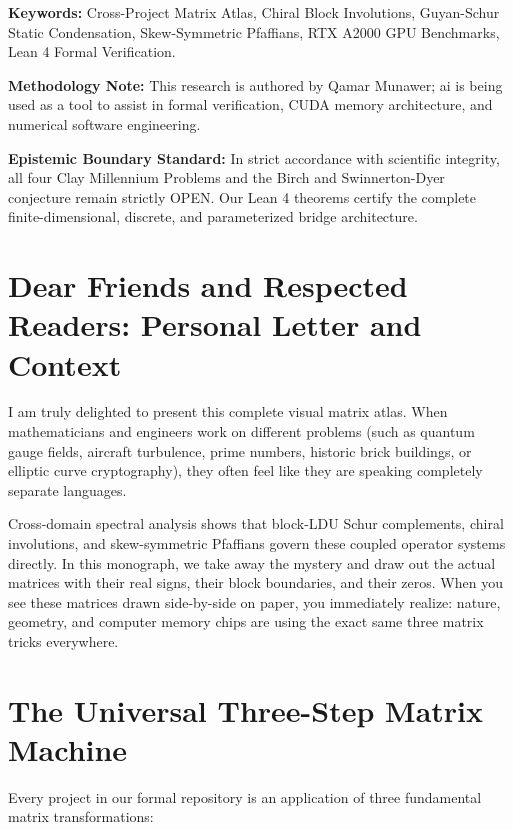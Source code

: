 \documentclass[11pt,a4paper]{article}
\begin{document}
\vspace{0.5em}
\noindent\textbf{Keywords:} Cross-Project Matrix Atlas, Chiral Block Involutions, Guyan-Schur Static Condensation, Skew-Symmetric Pfaffians, RTX A2000 GPU Benchmarks, Lean 4 Formal Verification.

\vspace{0.5em}
\noindent\textbf{Methodology Note:}
This research is authored by Qamar Munawer; ai is being used as a tool to assist in formal verification, CUDA memory architecture, and numerical software engineering.

\vspace{0.5em}
\noindent\textbf{Epistemic Boundary Standard:}
In strict accordance with scientific integrity, all four Clay Millennium Problems and the Birch and Swinnerton-Dyer conjecture remain strictly OPEN. Our Lean 4 theorems certify the complete finite-dimensional, discrete, and parameterized bridge architecture.

\newpage

\section*{Dear Friends and Respected Readers: Personal Letter and Context}
I am truly delighted to present this complete visual matrix atlas. When mathematicians and engineers work on different problems (such as quantum gauge fields, aircraft turbulence, prime numbers, historic brick buildings, or elliptic curve cryptography), they often feel like they are speaking completely separate languages. 

Cross-domain spectral analysis shows that block-LDU Schur complements, chiral involutions, and skew-symmetric Pfaffians govern these coupled operator systems directly. In this monograph, we take away the mystery and draw out the actual matrices with their real signs, their block boundaries, and their zeros. When you see these matrices drawn side-by-side on paper, you immediately realize: nature, geometry, and computer memory chips are using the exact same three matrix tricks everywhere.

\section{The Universal Three-Step Matrix Machine}
Every project in our formal repository is an application of three fundamental matrix transformations:
\end{document}
